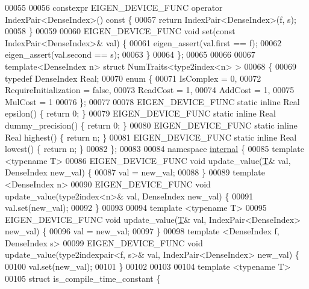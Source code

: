 \begin{DoxyCode}
00055 
00056   constexpr EIGEN\_DEVICE\_FUNC \textcolor{keyword}{operator} IndexPair<DenseIndex>() \textcolor{keyword}{const} \{
00057     \textcolor{keywordflow}{return} IndexPair<DenseIndex>(f, s);
00058   \}
00059 
00060   EIGEN\_DEVICE\_FUNC \textcolor{keywordtype}{void} \textcolor{keyword}{set}(\textcolor{keyword}{const} IndexPair<DenseIndex>& val) \{
00061     eigen\_assert(val.first == f);
00062     eigen\_assert(val.second == s);
00063   \}
00064 \};
00065 
00066 
00067 \textcolor{keyword}{template}<DenseIndex n> \textcolor{keyword}{struct }NumTraits<type2index<n> >
00068 \{
00069   \textcolor{keyword}{typedef} DenseIndex Real;
00070   \textcolor{keyword}{enum} \{
00071     IsComplex = 0,
00072     RequireInitialization = \textcolor{keyword}{false},
00073     ReadCost = 1,
00074     AddCost = 1,
00075     MulCost = 1
00076   \};
00077 
00078   EIGEN\_DEVICE\_FUNC \textcolor{keyword}{static} \textcolor{keyword}{inline} Real epsilon() \{ \textcolor{keywordflow}{return} 0; \}
00079   EIGEN\_DEVICE\_FUNC \textcolor{keyword}{static} \textcolor{keyword}{inline} Real dummy\_precision() \{ \textcolor{keywordflow}{return} 0; \}
00080   EIGEN\_DEVICE\_FUNC \textcolor{keyword}{static} \textcolor{keyword}{inline} Real highest() \{ \textcolor{keywordflow}{return} n; \}
00081   EIGEN\_DEVICE\_FUNC \textcolor{keyword}{static} \textcolor{keyword}{inline} Real lowest() \{ \textcolor{keywordflow}{return} n; \}
00082 \};
00083 
00084 \textcolor{keyword}{namespace }\hyperlink{namespaceinternal}{internal} \{
00085 \textcolor{keyword}{template} <\textcolor{keyword}{typename} T>
00086 EIGEN\_DEVICE\_FUNC \textcolor{keywordtype}{void} update\_value(\hyperlink{group___sparse_core___module_class_eigen_1_1_triplet}{T}& val, DenseIndex new\_val) \{
00087   val = new\_val;
00088 \}
00089 \textcolor{keyword}{template} <DenseIndex n>
00090 EIGEN\_DEVICE\_FUNC \textcolor{keywordtype}{void} update\_value(type2index<n>& val, DenseIndex new\_val) \{
00091   val.set(new\_val);
00092 \}
00093 
00094 \textcolor{keyword}{template} <\textcolor{keyword}{typename} T>
00095 EIGEN\_DEVICE\_FUNC \textcolor{keywordtype}{void} update\_value(\hyperlink{group___sparse_core___module_class_eigen_1_1_triplet}{T}& val, IndexPair<DenseIndex> new\_val) \{
00096   val = new\_val;
00097 \}
00098 \textcolor{keyword}{template} <DenseIndex f, DenseIndex s>
00099 EIGEN\_DEVICE\_FUNC \textcolor{keywordtype}{void} update\_value(type2indexpair<f, s>& val, IndexPair<DenseIndex> new\_val) \{
00100   val.set(new\_val);
00101 \}
00102 
00103 
00104 \textcolor{keyword}{template} <\textcolor{keyword}{typename} T>
00105 \textcolor{keyword}{struct }is\_compile\_time\_constant \{

\end{DoxyCode}
